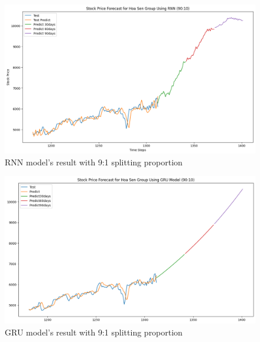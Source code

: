 \documentclass{ieeeojies}
\begin{document}
\begin{figure}[H]
  \centering
  \begin{minipage}{0.8\linewidth}
    \centering
    \includegraphics[width=\linewidth]{bibliography/RNN_HSG.png}
    \caption{RNN model's result with 9:1 splitting proportion}
    \label{fig19}
  \end{minipage}
\end{figure}
\begin{figure}[H]
  \centering
  \begin{minipage}{0.8\linewidth}
    \centering
    \includegraphics[width=\linewidth]{bibliography/GRU_HSG_90-10.png}
    \caption{GRU model's result with 9:1 splitting proportion}
    \label{fig20}
  \end{minipage}
\end{figure}
\end{document}

